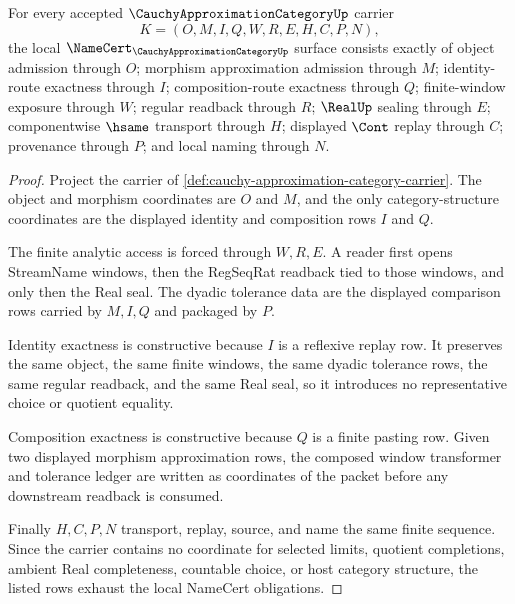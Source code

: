 \begin{theorem}
\label{thm:cauchy-approximation-category-obligations}
For every accepted $\CauchyApproximationCategoryUp$ carrier
$$
K=(O,M,I,Q,W,R,E,H,C,P,N),
$$
the local $\NameCert_{\CauchyApproximationCategoryUp}$ surface consists exactly of object admission through $O$; morphism approximation admission through $M$; identity-route exactness through $I$; composition-route exactness through $Q$; finite-window exposure through $W$; regular readback through $R$; $\RealUp$ sealing through $E$; componentwise $\hsame$ transport through $H$; displayed $\Cont$ replay through $C$; provenance through $P$; and local naming through $N$.
\end{theorem}
\begin{proof}
Project the carrier of \autoref{def:cauchy-approximation-category-carrier}. The object and morphism coordinates are $O$ and $M$, and the only category-structure coordinates are the displayed identity and composition rows $I$ and $Q$.

The finite analytic access is forced through $W,R,E$. A reader first opens StreamName windows, then the RegSeqRat readback tied to those windows, and only then the Real seal. The dyadic tolerance data are the displayed comparison rows carried by $M,I,Q$ and packaged by $P$.

Identity exactness is constructive because $I$ is a reflexive replay row. It preserves the same object, the same finite windows, the same dyadic tolerance rows, the same regular readback, and the same Real seal, so it introduces no representative choice or quotient equality.

Composition exactness is constructive because $Q$ is a finite pasting row. Given two displayed morphism approximation rows, the composed window transformer and tolerance ledger are written as coordinates of the packet before any downstream readback is consumed.

Finally $H,C,P,N$ transport, replay, source, and name the same finite sequence. Since the carrier contains no coordinate for selected limits, quotient completions, ambient Real completeness, countable choice, or host category structure, the listed rows exhaust the local NameCert obligations.
\end{proof}



